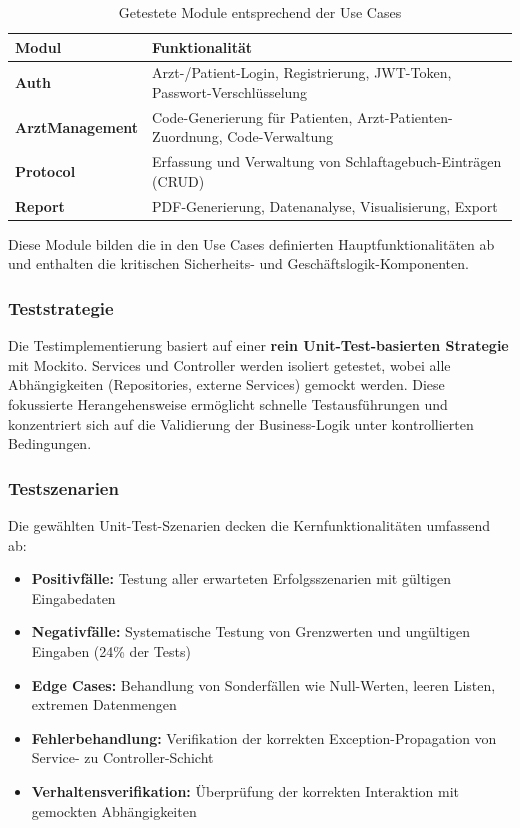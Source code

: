 \begin{table}[h]
\centering
\begin{tabular}{|l|p{}|}
\hline
\textbf{Modul} & \textbf{Funktionalität} \\
\hline
\textbf{Auth} & Arzt-/Patient-Login, Registrierung, JWT-Token, Passwort-Verschlüsselung \\
\hline
\textbf{ArztManagement} & Code-Generierung für Patienten, Arzt-Patienten-Zuordnung, Code-Verwaltung \\
\hline
\textbf{Protocol} & Erfassung und Verwaltung von Schlaftagebuch-Einträgen (CRUD) \\
\hline
\textbf{Report} & PDF-Generierung, Datenanalyse, Visualisierung, Export \\
\hline
\end{tabular}
\caption{Getestete Module entsprechend der Use Cases}
\end{table}

Diese Module bilden die in den Use Cases definierten Hauptfunktionalitäten ab und enthalten die kritischen Sicherheits- und Geschäftslogik-Komponenten.

\subsubsection{Teststrategie}

Die Testimplementierung basiert auf einer \textbf{rein Unit-Test-basierten Strategie} mit Mockito. Services und Controller werden isoliert getestet, wobei alle Abhängigkeiten (Repositories, externe Services) gemockt werden. Diese fokussierte Herangehensweise ermöglicht schnelle Testausführungen und konzentriert sich auf die Validierung der Business-Logik unter kontrollierten Bedingungen.
\subsubsection{Testszenarien}

Die gewählten Unit-Test-Szenarien decken die Kernfunktionalitäten umfassend ab:

\begin{itemize}
    \item \textbf{Positivfälle:} Testung aller erwarteten Erfolgsszenarien mit gültigen Eingabedaten
    \item \textbf{Negativfälle:} Systematische Testung von Grenzwerten und ungültigen Eingaben (24\% der Tests)
    \item \textbf{Edge Cases:} Behandlung von Sonderfällen wie Null-Werten, leeren Listen, extremen Datenmengen
    \item \textbf{Fehlerbehandlung:} Verifikation der korrekten Exception-Propagation von Service- zu Controller-Schicht
    \item \textbf{Verhaltensverifikation:} Überprüfung der korrekten Interaktion mit gemockten Abhängigkeiten
\end{itemize}

